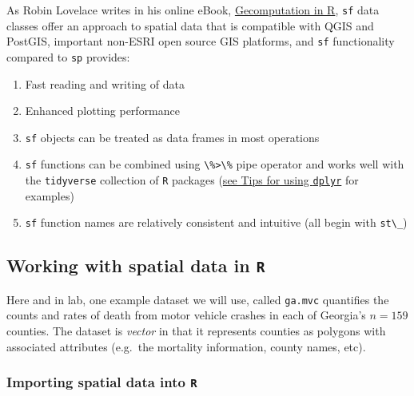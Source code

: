 \documentclass[
]{book}
\newcommand{\passthrough}[1]{#1}
\providecommand{\tightlist}{%
  \setlength{\itemsep}{0pt}\setlength{\parskip}{0pt}}
\begin{document}
As Robin Lovelace writes in his online eBook, \href{https://geocompr.robinlovelace.net/}{Gecomputation in R}, \passthrough{\lstinline!sf!} data classes offer an approach to spatial data that is compatible with QGIS and PostGIS, important non-ESRI open source GIS platforms, and \passthrough{\lstinline!sf!} functionality compared to \passthrough{\lstinline!sp!} provides:

\begin{enumerate}
\def\labelenumi{\arabic{enumi}.}
\tightlist
\item
  Fast reading and writing of data
\item
  Enhanced plotting performance
\item
  \passthrough{\lstinline!sf!} objects can be treated as data frames in most operations
\item
  \passthrough{\lstinline!sf!} functions can be combined using \passthrough{\lstinline!\%>\%!} pipe operator and works well with the \passthrough{\lstinline!tidyverse!} collection of \passthrough{\lstinline!R!} packages (\protect\hyperlink{dplyr}{see Tips for using \passthrough{\lstinline!dplyr!}} for examples)
\item
  \passthrough{\lstinline!sf!} function names are relatively consistent and intuitive (all begin with \passthrough{\lstinline!st\_!})
\end{enumerate}

\hypertarget{working-with-spatial-data-in-r}{%
\subsection{\texorpdfstring{Working with spatial data in \texttt{R}}{Working with spatial data in R}}\label{working-with-spatial-data-in-r}}

Here and in lab, one example dataset we will use, called \passthrough{\lstinline!ga.mvc!} quantifies the counts and rates of death from motor vehicle crashes in each of Georgia's \(n=159\) counties. The dataset is \emph{vector} in that it represents counties as polygons with associated attributes (e.g.~the mortality information, county names, etc).

\hypertarget{importing-spatial-data-into-r}{%
\subsubsection{\texorpdfstring{Importing spatial data into \texttt{R}}{Importing spatial data into R}}\label{importing-spatial-data-into-r}}
\end{document}
